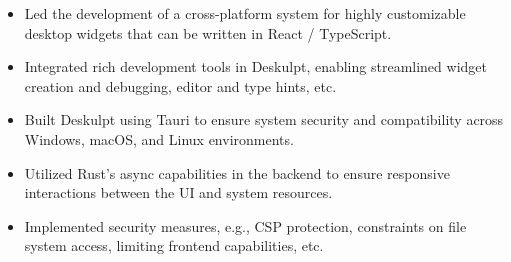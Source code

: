 


\begin{itemize}[nosep]
  \item Led the development of a cross-platform system for highly customizable desktop widgets that can be written in React / TypeScript.
  \item Integrated rich development tools in Deskulpt, enabling streamlined widget creation and debugging, editor and type hints, etc.
  \item Built Deskulpt using Tauri to ensure system security and compatibility across Windows, macOS, and Linux environments.
  \item Utilized Rust's async capabilities in the backend to ensure responsive interactions between the UI and system resources.
  \item Implemented security measures, e.g., CSP protection, constraints on file system access, limiting frontend capabilities, etc.
\end{itemize}

